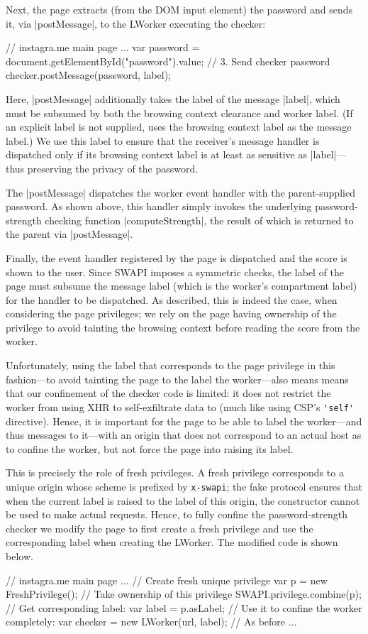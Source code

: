 Next, the page extracts (from the DOM input element) the password and
sends it, via \js|postMessage|, to the LWorker executing the checker:
\begin{jscode}
// instagra.me main page ...
var password = 
 document.getElementById("password").value;
// 3. Send checker password 
checker.postMessage(password, label);
\end{jscode}
Here, \js|postMessage| additionally takes the label of the message
\js|label|, which must be subsumed by both the browsing context
clearance and worker label.
%
(If an explicit label is not supplied, \sys{} uses the browsing
context label as the message label.)
%
We use this label to ensure that the receiver's message handler is
dispatched only if its browsing context label is at least as sensitive
as \js|label|---thus preserving the privacy of the password.

The \js|postMessage| dispatches the worker event handler with the
parent-supplied password. 
%
As shown above, this handler simply invokes the underlying
password-strength checking function \js|computeStrength|, the result
of which is returned to the parent via \js|postMessage|.
%

Finally, the event handler registered by the page is dispatched and
the score is shown to the user.
%
Since SWAPI imposes a symmetric checks, the label of the page must
subsume the message label (which is the worker's compartment label)
for the handler to be dispatched.
%
As described, this is indeed the case, when considering the page
privileges;
%
we rely on the page having ownership of the 
privilege to avoid tainting the browsing context before reading the
score from the worker.

%
Unfortunately, using the label that corresponds to the page privilege
in this fashion---to avoid tainting the page to the label the
worker---also means means that our confinement of the checker code is
limited: it does not restrict the worker from using XHR to
self-exfiltrate data to  (much like using CSP's
\verb|'self'| directive).
%
Hence, it is important for the page to be able to label the
worker---and thus messages to it---with an origin that does not
correspond to an actual host as to confine the worker, but not force
the page into raising its label.

This is precisely the role of fresh privileges.
%
A fresh privilege corresponds to a unique origin whose scheme is
prefixed by \texttt{x-swapi}; the fake protocol ensures that when the
current label is raised to the label of this origin, the \xhr{}
constructor cannot be used to make actual requests.
%
Hence, to fully confine the password-strength checker we modify the
 page to first create a fresh privilege and use the
corresponding label when creating the LWorker.
%
The modified code is shown below.
\begin{jscode}
// instagra.me main page ...
// Create fresh unique privilege
var p = new FreshPrivilege();
// Take ownership of this privilege
SWAPI.privilege.combine(p);
// Get corresponding label:
var label = p.asLabel;
// Use it to confine the worker completely:
var checker = new LWorker(url, label);
// As before ...
\end{jscode}

